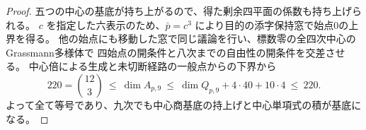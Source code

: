 \begin{proof}
五つの中心の基底が持ち上がるので、得た剰余四平面の係数も持ち上げられる。
$c$ を指定した六表示のため、$\bar p=c^3$ により目的の添字保持窓で始点0の上界を得る。
他の始点にも移動した窓で同じ議論を行い、標数零の全四次中心のGrassmann多様体で
四始点の開条件と八次までの自由性の開条件を交差させる。
中心倍による生成と未切断経路の一般点からの下界から
\[
  220=\binom{12}{3}\ \le\ \dim A_{p,9}\
     \le\ \dim Q_{p,9}+4\cdot40+10\cdot4\ \le\ 220 .
\]
よって全て等号であり、九次でも中心商基底の持上げと中心単項式の積が基底になる。
\end{proof}
